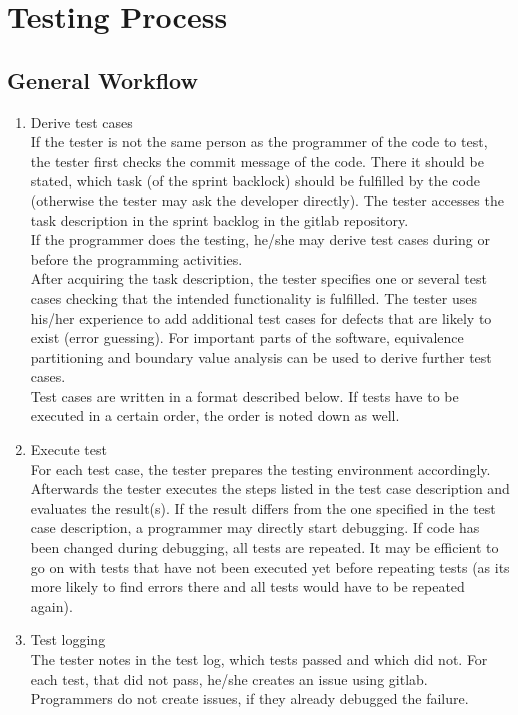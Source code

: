 \documentclass[twoside,12pt,a4paper]{article}
\begin{document}
\section{Testing Process} %
\label{sec:testing_process}

\subsection{General Workflow} %
\label{sub:general_workflow}

\begin{enumerate}
 	\item Derive test cases \\
 	If the tester is not the same person as the programmer of the code to test, the tester first checks the commit message of the code. There it should be stated, which task (of the sprint backlock) should be fulfilled by the code (otherwise the tester may ask the developer directly). The tester accesses the task description in the sprint backlog in the gitlab repository. \\
 	If the programmer does the testing, he/she may derive test cases during or before the programming activities. \\
 	After acquiring the task description, the tester specifies one or several test cases checking that the intended functionality is fulfilled. The tester uses his/her experience to add additional test cases for defects that are likely to exist (error guessing). For important parts of the software, equivalence partitioning and boundary value analysis can be used to derive further test cases. \\
 	Test cases are written in a format described below. If tests have to be executed in a certain order, the order is noted down as well.

 	\item Execute test \\
 	For each test case, the tester prepares the testing environment accordingly. Afterwards the tester executes the steps listed in the test case description and evaluates the result(s). If the result differs from the one specified in the test case description, a programmer may directly start debugging. If code has been changed during debugging, all tests are repeated. It may be efficient to go on with tests that have not been executed yet before repeating tests (as its more likely to find errors there and all tests would have to be repeated again).

 	\item Test logging \\
 	The tester notes in the test log, which tests passed and which did not. For each test, that did not pass, he/she creates an issue using gitlab. Programmers do not create issues, if they already debugged the failure.

\end{enumerate}
\end{document}
